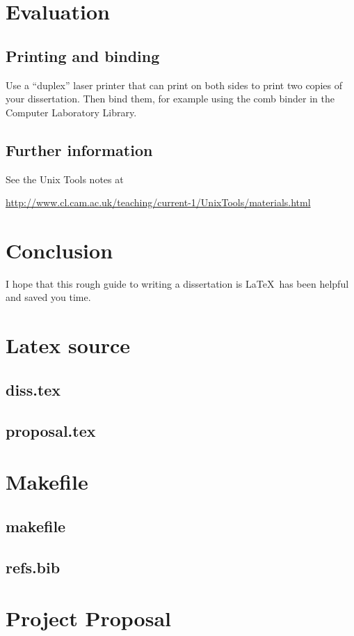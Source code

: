 \documentclass[12pt,a4paper,twoside,openright]{report}
\begin{document}
\chapter{Evaluation}

\section{Printing and binding}

Use a ``duplex'' laser printer that can print on both sides to print
two copies of your dissertation. Then bind them, for example using the
comb binder in the Computer Laboratory Library.

\section{Further information}

See the Unix Tools notes at

\url{http://www.cl.cam.ac.uk/teaching/current-1/UnixTools/materials.html}


\chapter{Conclusion}

I hope that this rough guide to writing a dissertation is \LaTeX\ has
been helpful and saved you time.




\appendix

\chapter{Latex source}

\section{diss.tex}
{\scriptsize}

\section{proposal.tex}
{\scriptsize}

\chapter{Makefile}

\section{makefile}\label{makefile}
{\scriptsize}

\section{refs.bib}
{\scriptsize}


\chapter{Project Proposal}


\end{document}
